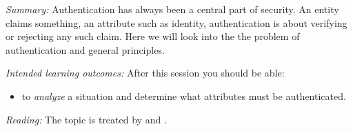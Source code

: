 \emph{Summary:}
Authentication has always been a central part of security.
An entity claims something, an attribute such as identity, authentication is 
about verifying or rejecting any such claim.
Here we will look into the the problem of authentication and general 
principles.

\emph{Intended learning outcomes:}
After this session you should be able:
\begin{itemize}
  \item to \emph{analyze} a situation and determine what attributes must be 
    authenticated.
\end{itemize}

\emph{Reading:}
The topic is treated by \textcite[Ch.~4]{Gollmann2011cs} and 
\textcite[Ch.~2]{Anderson2008sea}.
